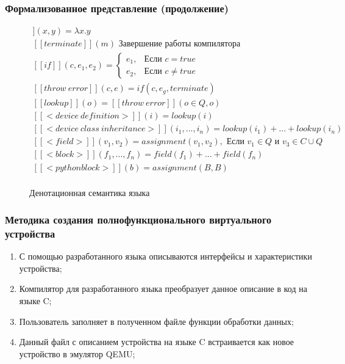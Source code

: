 \begin{frame}%
    \frametitle{Формализованное представление (продолжение)}
    \begin{figure}[!htbp]
        \begin{adjustbox}{max totalsize={\textwidth}{\textheight}}
        \begin{minipage}{\linewidth}
                \centering
                \begingroup
                \begin{gather*}
                    [[assignment]](x,y) = \lambda x.y \\
                    [[terminate]](m) \text{ Завершение работы компилятора} \\
                    [[if]](c,e_1,e_2) =
                    \begin{cases}
                        e_1, & \text{Если } c = true \\
                        e_2, & \text{Если } c \not= true
                    \end{cases} \\
                    [[throw\ error]](c, e) = if(c, e_g, terminate) \\
                    [[lookup]](o) = [[throw\ error]](o \in Q, o) \\
                    [[<device\ definition>]](i) = lookup(i) \\
                    [[<device\ class\ inheritance>]](i_1,...,i_n) = lookup(i_1) + ... + lookup(i_n) \\
                    [[<field>]](v_1, v_2) = assignment(v_1, v_2), \text{ Если } v_1 \in Q \text{ и } v_3 \in C \cup Q \\
                    [[<block>]](f_1,...,f_n) = field(f_1) + ... + field(f_n) \\
                    [[<python block>]](b) = assignment(B,B)\\
                \end{gather*}
                \endgroup
            \end{minipage}
        \end{adjustbox}
        \caption{Денотационная семантика языка {\mylanguage}}\label{fig:denotational-semantics}
    \end{figure}
\end{frame}%

\begin{frame}%
    \frametitle{Методика создания полнофункционального виртуального устройства}
    \begin{enumerate}
        \item С помощью разработанного языка описываются интерфейсы и характеристики устройства;
        \item Компилятор для разработанного языка преобразует данное описание в код на языке C;
        \item Пользователь заполняет в полученном файле функции обработки данных;
        \item Данный файл с описанием устройства на языке C встраивается как новое устройство в эмулятор QEMU;
    \end{enumerate}
\end{frame}


